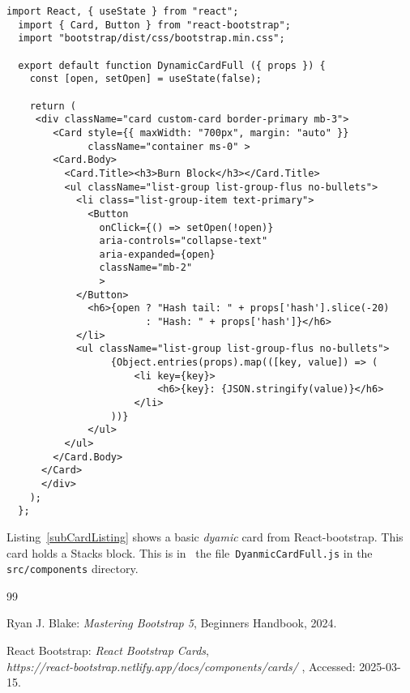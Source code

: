 \documentclass[12pt]{article}
\begin{document}
%
%
\pagebreak
%
%
%
\begin{lstlisting}[label=subCardListing,style=JSES6Base, caption={Basic Dynamic Card for a Stacks block}]
  import React, { useState } from "react";
  import { Card, Button } from "react-bootstrap";
  import "bootstrap/dist/css/bootstrap.min.css";
  
  export default function DynamicCardFull ({ props }) {
    const [open, setOpen] = useState(false);
  
    return (
     <div className="card custom-card border-primary mb-3">
        <Card style={{ maxWidth: "700px", margin: "auto" }} 
              className="container ms-0" >
        <Card.Body>
          <Card.Title><h3>Burn Block</h3></Card.Title>
          <ul className="list-group list-group-flus no-bullets">
            <li class="list-group-item text-primary">
              <Button
                onClick={() => setOpen(!open)}
                aria-controls="collapse-text"
                aria-expanded={open}
                className="mb-2"
                >
            </Button>
              <h6>{open ? "Hash tail: " + props['hash'].slice(-20) 
                        : "Hash: " + props['hash']}</h6>
            </li>
            <ul className="list-group list-group-flus no-bullets">
                  {Object.entries(props).map(([key, value]) => (
                      <li key={key}>
                          <h6>{key}: {JSON.stringify(value)}</h6>
                      </li>
                  ))}
              </ul>
          </ul>
        </Card.Body>
      </Card>
      </div>
    );
  };
\end{lstlisting}

Listing~\ref{subCardListing} shows a basic {\em dyamic} card from React-bootstrap.
This card holds a Stacks block.
This is in~ the file~\lstinline[language=bash]|DyanmicCardFull.js| in the \lstinline[language=bash]|src/components| directory.




%
%
%
%
\begin {thebibliography}{99}
%



 Ryan J. Blake:
	      {\em Mastering Bootstrap 5},
	     Beginners Handbook,
       2024.

       
 React Bootstrap:
        {\em React Bootstrap Cards},\\
        {\em https://react-bootstrap.netlify.app/docs/components/cards/ },
       Accessed: 2025-03-15.

\end {thebibliography}
\end{document}
